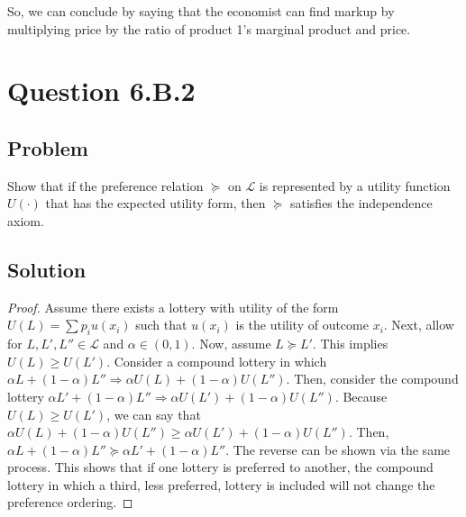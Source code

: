 \documentclass[10pt, a4paper]{article}
\begin{document}
      So, we can conclude by saying that the economist can find markup by multiplying price by the ratio of product 1's marginal product and price. 
  \section{Question 6.B.2}
    \subsection*{Problem}
      Show that if the preference relation $\succeq$ on $\mathcal{L}$ is represented by a utility function $U(\cdot)$ that has the expected utility form, then $\succeq$ satisfies the independence axiom. 
    \subsection*{Solution}
      \begin{proof}
        Assume there exists a lottery with utility of the form $U(L)=\sum p_iu(x_i)$ such that $u(x_i)$ is the utility of outcome $x_i$. Next, allow for $L, L', L''\in \mathcal{L}$ and $\alpha\in(0,1)$. Now, assume $L\succeq L'$. This implies $U(L)\geq U(L')$. Consider a compound lottery in which $\alpha L+(1-\alpha)L'' \Rightarrow \alpha U(L)+(1-\alpha)U(L'')$. Then, consider the compound lottery $\alpha L' +(1-\alpha)L''\Rightarrow \alpha U(L')+(1-\alpha)U(L'')$. Because $U(L)\geq U(L')$, we can say that $\alpha U(L)+(1-\alpha)U(L'')\geq \alpha U(L')+(1-\alpha)U(L'')$. Then, $\alpha L+(1-\alpha)L''\succeq \alpha L'+(1-\alpha) L''$. The reverse can be shown via the same process. This shows that if one lottery is preferred to another, the compound lottery in which a third, less preferred, lottery is included will not change the preference ordering.  
      \end{proof}
\end{document}
